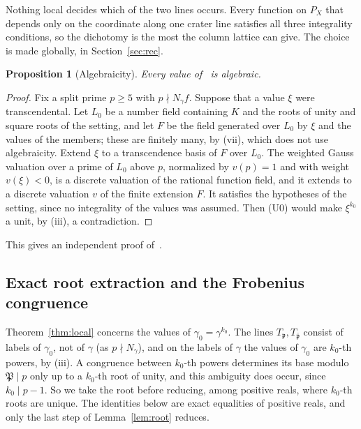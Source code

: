 \documentclass[11pt]{amsart}
\numberwithin{equation}{section}
\theoremstyle{plain}
\newtheorem{proposition}[theorem]{Proposition}
\theoremstyle{definition}
\theoremstyle{remark}
\begin{document}
Nothing local decides which of the two lines occurs. Every function on \(P_X\) that depends only on the coordinate along one crater line satisfies all three integrality conditions, so the dichotomy is the most the column lattice can give. The choice is made globally, in Section~\ref{sec:rec}.

\begin{proposition}[Algebraicity]\label{prop:alg}
Every value of~\cite{RW} is algebraic.
\end{proposition}

\begin{proof}
Fix a split prime \(p\ge5\) with \(p\nmid N_\gamma f\). Suppose that a value \(\xi\) were transcendental. Let \(L_0\) be a number field containing \(K\) and the roots of unity and square roots of the setting, and let \(F\) be the field generated over \(L_0\) by \(\xi\) and the values of the members; these are finitely many, by (vii), which does not use algebraicity. Extend \(\xi\) to a transcendence basis of \(F\) over \(L_0\). The weighted Gauss valuation over a prime of \(L_0\) above \(p\), normalized by \(v(p)=1\) and with weight \(v(\xi)<0\), is a discrete valuation of the rational function field, and it extends to a discrete valuation \(v\) of the finite extension \(F\). It satisfies the hypotheses of the setting, since no integrality of the values was assumed. Then (U0) would make \(\xi^{k_0}\) a unit, by (iii), a contradiction.
\end{proof}

This gives an independent proof of~\cite[Thm.~1]{RW}.

\subsection{Exact root extraction and the Frobenius congruence}\label{sec:root}

Theorem~\ref{thm:local} concerns the values of \(\gamma_0=\gamma^{k_0}\). The lines \(T_{\mathfrak p},T_{\bar{\mathfrak p}}\) consist of labels of \(\gamma_0\), not of \(\gamma\) (as \(p\nmid N_\gamma\)), and on the labels of \(\gamma\) the values of \(\gamma_0\) are \(k_0\)-th powers, by (iii). A congruence between \(k_0\)-th powers determines its base modulo \(\mathfrak P\mid p\) only up to a \(k_0\)-th root of unity, and this ambiguity does occur, since \(k_0\mid p-1\). So we take the root before reducing, among positive reals, where \(k_0\)-th roots are unique. The identities below are exact equalities of positive reals, and only the last step of Lemma~\ref{lem:root} reduces.
\end{document}
